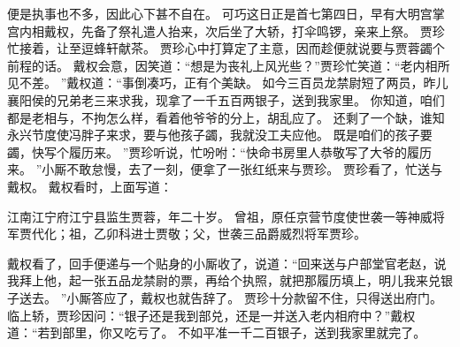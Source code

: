 便是执事也不多，因此心下甚不自在。
可巧这日正是首七第四日，早有大明宫掌宫内相戴权，先备了祭礼遣人抬来，次后坐了大轿，打伞鸣锣，亲来上祭。
贾珍忙接着，让至逗蜂轩献茶。
贾珍心中打算定了主意，因而趁便就说要与贾蓉蠲个前程的话。
戴权会意，因笑道：“想是为丧礼上风光些？”贾珍忙笑道：“老内相所见不差。
”戴权道：“事倒凑巧，正有个美缺。
如今三百员龙禁尉短了两员，昨儿襄阳侯的兄弟老三来求我，现拿了一千五百两银子，送到我家里。
你知道，咱们都是老相与，不拘怎么样，看着他爷爷的分上，胡乱应了。
还剩了一个缺，谁知永兴节度使冯胖子来求，要与他孩子蠲，我就没工夫应他。
既是咱们的孩子要蠲，快写个履历来。
”贾珍听说，忙吩咐：“快命书房里人恭敬写了大爷的履历来。
”小厮不敢怠慢，去了一刻，便拿了一张红纸来与贾珍。
贾珍看了，忙送与戴权。
戴权看时，上面写道：\par
\hop
江南江宁府江宁县监生贾蓉，年二十岁。
曾祖，原任京营节度使世袭一等神威将军贾代化；祖，乙卯科进士贾敬；父，世袭三品爵威烈将军贾珍。
\par
\hop
戴权看了，回手便递与一个贴身的小厮收了，说道：“回来送与户部堂官老赵，说我拜上他，起一张五品龙禁尉的票，再给个执照，就把那履历填上，明儿我来兑银子送去。
”小厮答应了，戴权也就告辞了。
贾珍十分款留不住，只得送出府门。
临上轿，贾珍因问：“银子还是我到部兑，还是一并送入老内相府中？”戴权道：“若到部里，你又吃亏了。
不如平准一千二百银子，送到我家里就完了。
